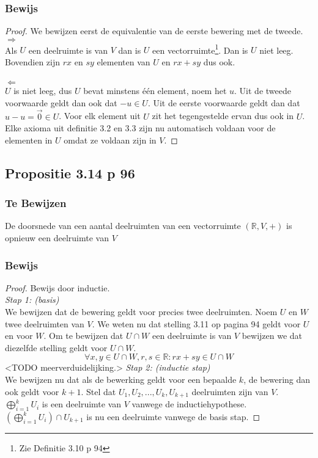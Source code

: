 \documentclass[lineaire_algebra_oplossingen.tex]{subfiles}
\begin{document}
\subsubsection*{Bewijs}
\begin{proof}
We bewijzen eerst de equivalentie van de eerste bewering met de tweede.\\
\emph{$\Rightarrow$}\\
Als $U$ een deelruimte is van $V$ dan is $U$ een vectorruimte\footnote{Zie Definitie 3.10 p 94}. Dan is $U$ niet leeg. Bovendien zijn $rx$ en $sy$ elementen van $U$ en $rx+sy$ dus ook.\\\\
\emph{$\Leftarrow$}\\
$U$ is niet leeg, dus $U$ bevat minstens \'e\'en element, noem het $u$. Uit de tweede voorwaarde geldt dan ook dat $-u \in U$. Uit de eerste voorwaarde geldt dan dat $u-u = \vec{0} \in U$. Voor elk element uit $U$ zit het tegengestelde ervan dus ook in $U$. Elke axioma uit definitie 3.2 en 3.3 zijn nu automatisch voldaan voor de elementen in $U$ omdat ze voldaan zijn in $V$.
\end{proof}

\subsection{Propositie 3.14 p 96}
\subsubsection*{Te Bewijzen}
De doorsnede van een aantal deelruimten van een vectorruimte $(\mathbb{R},V,+)$ is opnieuw een deelruimte van $V$
\subsubsection*{Bewijs}
\begin{proof}
Bewijs door inductie.\\
\emph{Stap 1: (basis)}\\
We bewijzen dat de bewering geldt voor precies twee deelruimten.
Noem $U$ en $W$ twee deelruimten van $V$. We weten nu dat stelling 3.11 op pagina 94 geldt voor $U$ en voor $W$. Om te bewijzen dat $U\cap W$ een deelruimte is van $V$ bewijzen we dat diezelfde stelling geldt voor $U\cap W$.
\[
\forall x,y\in U\cap W, r,s\in \mathbb{R}: rx+sy\in U\cap W
\]
<TODO meerverduidelijking.>
\emph{Stap 2: (inductie stap)}\\
We bewijzen nu dat als de bewerking geldt voor een bepaalde $k$, de bewering dan ook geldt voor $k+1$.
Stel dat $U_1,U_2,...,U_k,U_{k+1}$ deelruimten zijn van $V$. $\bigoplus_{i=1}^k U_i$ is een deelruimte van $V$ vanwege de inductiehypothese. $(\bigoplus_{i=1}^k U_i) \cap U_{k+1}$ is nu een deelruimte vanwege de basis stap.
\end{proof}
\end{document}
